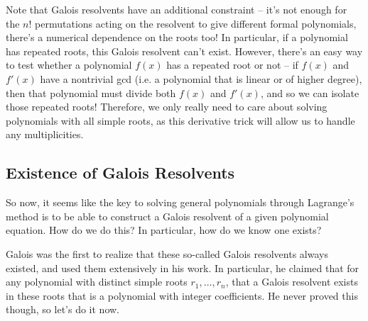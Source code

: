 \documentclass[12pt]{scrartcl}
\begin{document}
\begin{remark}
    Note that Galois resolvents have an additional constraint -- it's not enough for the $n!$ permutations acting on the resolvent to give different formal polynomials, there's a numerical dependence on the roots too! In particular, if a polynomial has repeated roots, this Galois resolvent can't exist. However, there's an easy way to test whether a polynomial $f(x)$ has a repeated root or not -- if $f(x)$ and $f'(x)$ have a nontrivial gcd (i.e. a polynomial that is linear or of higher degree), then that polynomial must divide both $f(x)$ and $f'(x)$, and so we can isolate those repeated roots! Therefore, we only really need to care about solving polynomials with all simple roots, as this derivative trick will allow us to handle any multiplicities. 
\end{remark}

\subsection{Existence of Galois Resolvents}
So now, it seems like the key to solving general polynomials through Lagrange's method is to be able to construct a Galois resolvent of a given polynomial equation. How do we do this? In particular, how do we know one exists? 

Galois was the first to realize that these so-called Galois resolvents always existed, and used them extensively in his work. In particular, he claimed that for any polynomial with distinct simple roots $r_1, \dots, r_n$, that a Galois resolvent exists in these roots that is a polynomial with integer coefficients. He never proved this though, so let's do it now. 
\end{document}
